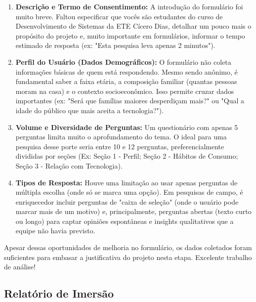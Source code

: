 \documentclass[
  sigconf,
  nonacm, %
  language=portuguese
]{acmart}
\newcommand{\statusok}[1]{{\small\bfseries\color{cgood}#1}}
\begin{document}
\begin{enumerate}[leftmargin=14pt,itemsep=2pt,topsep=4pt]
  \item \textbf{Descrição e Termo de Consentimento:} A introdução do formulário foi muito breve. Faltou especificar que vocês são estudantes do curso de Desenvolvimento de Sistemas da ETE Cícero Dias, detalhar um pouco mais o propósito do projeto e, muito importante em formulários, informar o tempo estimado de resposta (ex: "Esta pesquisa leva apenas 2 minutos").
  \item \textbf{Perfil do Usuário (Dados Demográficos):} O formulário não coleta informações básicas de quem está respondendo. Mesmo sendo anônimo, é fundamental saber a faixa etária, a composição familiar (quantas pessoas moram na casa) e o contexto socioeconômico. Isso permite cruzar dados importantes (ex: "Será que famílias maiores desperdiçam mais?" ou "Qual a idade do público que mais aceita a tecnologia?").
  \item \textbf{Volume e Diversidade de Perguntas:} Um questionário com apenas 5 perguntas limita muito o aprofundamento do tema. O ideal para uma pesquisa desse porte seria entre 10 e 12 perguntas, preferencialmente divididas por seções (Ex: Seção 1 - Perfil; Seção 2 - Hábitos de Consumo; Seção 3 - Relação com Tecnologia).
  \item \textbf{Tipos de Resposta:} Houve uma limitação ao usar apenas perguntas de múltipla escolha (onde só se marca uma opção). Em pesquisas de campo, é enriquecedor incluir perguntas de "caixa de seleção" (onde o usuário pode marcar mais de um motivo) e, principalmente, perguntas abertas (texto curto ou longo) para captar opiniões espontâneas e insights qualitativos que a equipe não havia previsto.
\end{enumerate}

Apesar dessas oportunidades de melhoria no formulário, os dados coletados foram suficientes para embasar a justificativa do projeto nesta etapa. Excelente trabalho de análise!

\subsection{Relatório de Imersão}

\noindent\statusok{1,00\,/\,1,00 pts · Completo}
\end{document}
